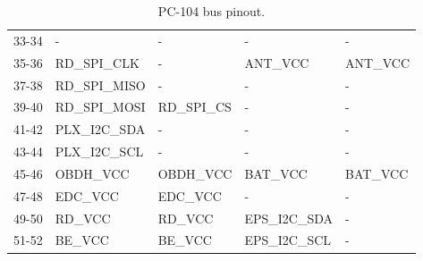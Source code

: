 \begin{table}[!h]
\begin{tabular}{cllll}
        33-34              & -                & -                & -               & -                \\
        35-36              & RD\_SPI\_CLK     & -                & ANT\_VCC        & ANT\_VCC         \\
        37-38              & RD\_SPI\_MISO    & -                & -               & -                \\
        39-40              & RD\_SPI\_MOSI    & RD\_SPI\_CS      & -               & -                \\
        41-42              & PLX\_I2C\_SDA    & -                & -               & -                \\
        43-44              & PLX\_I2C\_SCL    & -                & -               & -                \\
        45-46              & OBDH\_VCC        & OBDH\_VCC        & BAT\_VCC        & BAT\_VCC         \\
        47-48              & EDC\_VCC         & EDC\_VCC         & -               & -                \\
        49-50              & RD\_VCC          & RD\_VCC          & EPS\_I2C\_SDA   & -                \\
        51-52              & BE\_VCC          & BE\_VCC          & EPS\_I2C\_SCL   & -                \\
        \bottomrule[1.5pt]
    \end{tabular}
    \caption{PC-104 bus pinout.}
    \label{tab:pc104-pinout}
\end{table}

